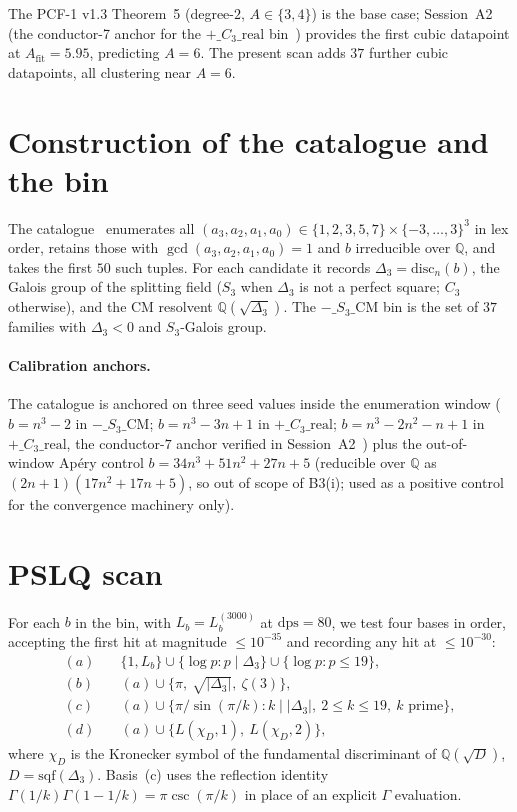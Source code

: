 \documentclass[11pt,reqno]{amsart}
\theoremstyle{definition}
\newcommand{\Q}{\mathbb{Q}}
\newcommand{\dps}{\mathrm{dps}}
\begin{document}
The PCF-1 v1.3 Theorem~5 (degree-$2$, $A\in\{3,4\}$) is the base case;
Session~A2 (the conductor-7 anchor for the $+\_C_3\_\mathrm{real}$
bin~\cite{sessA2}) provides the first cubic datapoint at $A_{\mathrm{fit}}
= 5.95$, predicting $A = 6$. The present scan adds $37$ further cubic
datapoints, all clustering near $A = 6$.

\section{Construction of the catalogue and the bin}\label{sec:cat}

The catalogue~\cite[Session~A]{pcf2v1} enumerates all
$(a_3,a_2,a_1,a_0)\in\{1,2,3,5,7\}\times\{-3,\dotsc,3\}^3$
in lex order, retains those with $\gcd(a_3,a_2,a_1,a_0)=1$ and $b$
irreducible over $\Q$, and takes the first $50$ such tuples. For each
candidate it records
$\Delta_3 = \mathrm{disc}_n(b)$, the Galois group of the splitting field
($S_3$ when $\Delta_3$ is not a perfect square; $C_3$ otherwise), and
the CM resolvent $\Q(\sqrt{\Delta_3})$. The $-\_S_3\_\mathrm{CM}$ bin is
the set of $37$ families with $\Delta_3<0$ and $S_3$-Galois group.

\paragraph{Calibration anchors.} The catalogue is anchored on three
seed values inside the enumeration window
($b = n^3 - 2$ in $-\_S_3\_\mathrm{CM}$;
$b = n^3 - 3n + 1$ in $+\_C_3\_\mathrm{real}$;
$b = n^3 - 2n^2 - n + 1$ in $+\_C_3\_\mathrm{real}$, the conductor-$7$
anchor verified in Session~A2~\cite{sessA2})
plus the out-of-window Ap{\'e}ry control
$b = 34n^3 + 51n^2 + 27n + 5$ (reducible over $\Q$ as
$(2n+1)(17n^2+17n+5)$, so out of scope of B3(i); used as a positive
control for the convergence machinery only).

\section{PSLQ scan}\label{sec:pslq}

For each $b$ in the bin, with $L_b = L_b^{(3000)}$ at $\dps = 80$,
we test four bases in order, accepting the first hit at magnitude
$\le 10^{-35}$ and recording any hit at $\le 10^{-30}$:
\begin{align}
   (a)\quad &\{1, L_b\} \cup \{\log p : p\mid \Delta_3\} \cup \{\log p : p\le 19\}, \\
   (b)\quad &(a) \cup \{\pi,\ \sqrt{|\Delta_3|},\ \zeta(3)\}, \\
   (c)\quad &(a) \cup \bigl\{\pi/\sin(\pi/k) : k\mid |\Delta_3|,\ 2\le k\le 19,\ k\text{ prime}\bigr\}, \\
   (d)\quad &(a) \cup \{L(\chi_D, 1),\ L(\chi_D, 2)\},
\end{align}
where $\chi_D$ is the Kronecker symbol of the fundamental discriminant
of $\Q(\sqrt{D})$, $D=\mathrm{sqf}(\Delta_3)$. Basis~(c) uses the
reflection identity $\Gamma(1/k)\Gamma(1-1/k) = \pi\csc(\pi/k)$ in
place of an explicit $\Gamma$ evaluation.
\end{document}
